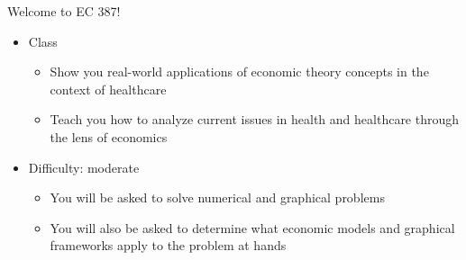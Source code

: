 \begin{frame}{Welcome to EC 387!}

    \begin{itemize}
        \item Class 
        \begin{itemize}
            \item Show you real-world applications of economic theory concepts in the context of healthcare
            \item Teach you how to analyze current issues in health and healthcare through the lens of economics
        \end{itemize}
        \vspace{3mm}

        \item Difficulty: moderate
        \begin{itemize}
            \item You will be asked to solve numerical and graphical problems
            \item You will also be asked to determine what economic models and graphical frameworks apply to the problem at hands
        \end{itemize}
    \end{itemize}
\end{frame}
